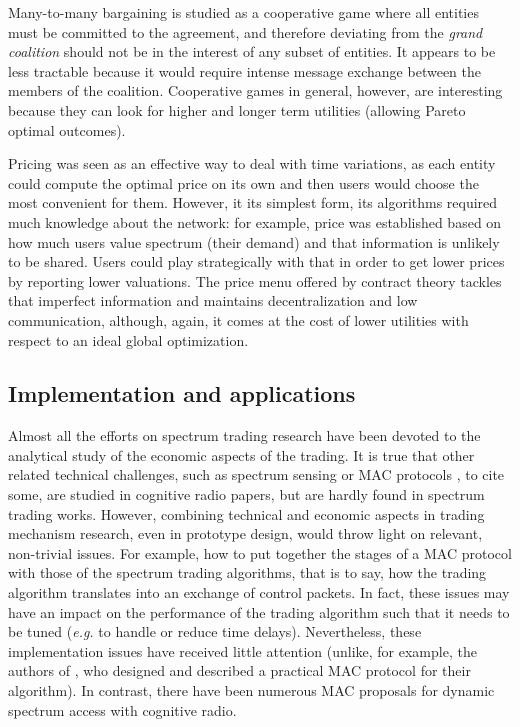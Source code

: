 Many-to-many bargaining is studied as a cooperative game where all entities must be committed to the agreement, and therefore deviating from the \textit{grand coalition} should not be in the interest of any subset of entities. 
It appears to be less tractable because it would require intense message exchange between the members of the coalition.
Cooperative games in general, however, are interesting because they can look for higher and longer term utilities (allowing Pareto optimal outcomes). 
	
Pricing was seen as an effective way to deal with time variations, as each entity could compute the optimal price on its own and then users would choose the most convenient for them. 
However, it its simplest form, its algorithms required much knowledge about the network: for example, price was established based on how much users value spectrum (their demand) and that information is unlikely to be shared. 
Users could play strategically with that in order to get lower prices by reporting lower valuations. The price menu offered by contract theory tackles that imperfect information and maintains decentralization and low communication, although, again, it comes at the cost of lower utilities with respect to an ideal global optimization. 

\subsection{Implementation and applications}
Almost all the efforts on spectrum trading research have been devoted to the analytical study of the economic aspects of the trading. 
It is true that other related technical challenges, such as spectrum sensing or MAC protocols \cite{ref:BWang2011,ref:Domenico2012}, to cite some, are studied in cognitive radio papers, but are hardly found in spectrum trading works. 
However, combining technical and economic aspects in trading mechanism research, even in prototype design, would throw light on relevant, non-trivial issues.
For example, how to put together the stages of a MAC protocol with those of the spectrum trading algorithms, that is to say, how the trading algorithm translates into an exchange of control packets. 
In fact, these issues may have an impact on the performance of the trading algorithm such that it needs to be tuned (\textit{e.g.} to handle or reduce time delays). 
Nevertheless, these implementation issues have received little attention (unlike, for example, the authors of \cite{ref:Wang2008}, who designed and described a practical MAC protocol for their algorithm). 
In contrast, there have been numerous MAC proposals \cite{ref:Domenico2012} for dynamic spectrum access with cognitive radio. 

